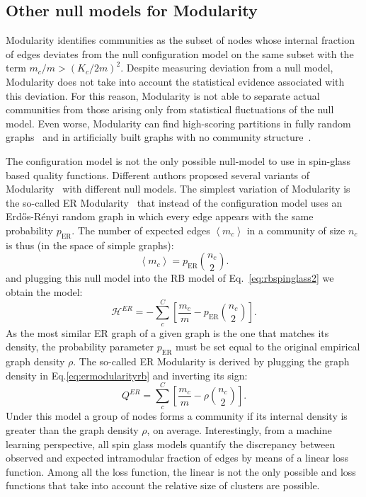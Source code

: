 \subsection{Other null models for Modularity}
Modularity identifies communities as the subset of nodes whose internal fraction of edges deviates from the null configuration model on the same subset with the term $m_c/m > (K_c/2m)^2$.
Despite measuring deviation from a null model, Modularity does not take into account the statistical evidence associated with this deviation. For this reason, Modularity is not able to separate actual communities from those arising only from statistical fluctuations of the null model. Even worse, Modularity can find high-scoring partitions in fully random graphs~\cite{guimera2004} and in artificially built graphs with no community structure~\cite{kehagias2013}.

The configuration model is not the only possible null-model to use in spin-glass based quality functions. Different authors proposed several variants of Modularity~\cite{ronhovde2010,ronhovde2009,traag2011} with different null models.
The simplest variation of Modularity is the so-called ER Modularity~\cite{traag2015} that instead of the configuration model uses an Erd\H{o}s-Rényi random graph in which every edge appears with the same probability $p_{\textrm{ER}}$. The number of expected edges $\left< m_c \right>$ in a community of size $n_c$ is thus (in the space of simple graphs):
\begin{equation}
\left< m_c \right> = p_{\textrm{ER}}\binom{n_c}{2}.
\end{equation}
and plugging this null model into the RB model of Eq.~\ref{eq:rbspinglass2} we obtain the model:
\begin{equation}\label{eq:ermodularityrb}
\mathcal{H}^{ER} = -\sum \limits_c^C \left[\frac{m_c}{m}  - p_{\textrm{ER}}\binom{n_c}{2} \right].
\end{equation}
As the most similar ER graph of a given graph is the one that matches its density, the probability parameter $p_{\textrm{ER}}$ must be set equal to the original empirical graph density $\rho$. The so-called ER Modularity is derived by plugging the graph density in Eq.\ref{eq:ermodularityrb} and inverting its sign: 
\begin{equation}
Q^{ER} = \sum \limits_c^C \left[\frac{m_c}{m}  - \rho \binom{n_c}{2} \right].
\end{equation}
Under this model a group of nodes forms a community if its internal density is greater than the graph density $\rho$, on average.
Interestingly, from a machine learning perspective, all spin glass models quantify the discrepancy between observed and expected intramodular fraction of edges by means of a linear loss function. Among all the loss function, the linear is not the only possible and loss functions that take into account the relative size of clusters are possible.

